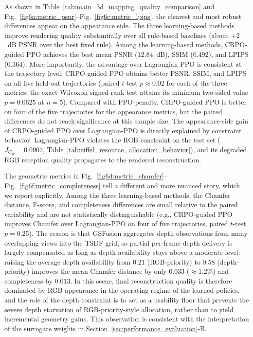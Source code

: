 \documentclass[journal]{IEEEtran}
\begin{document}
As shown in Table~\ref{tab:main_3d_mapping_quality_comparison} and Fig.~\ref{fig6a:metric_psnr}--Fig.~\ref{fig6c:metric_lpips}, the clearest and most robust differences appear on the appearance side. The three learning-based methods improve rendering quality substantially over all rule-based baselines (about $+2$~dB PSNR over the best fixed rule). Among the learning-based methods, CRPO-guided PPO achieves the best mean PSNR ($12.84$~dB), SSIM ($0.492$), and LPIPS ($0.364$). More importantly, the advantage over Lagrangian-PPO is consistent at the trajectory level: CRPO-guided PPO obtains better PSNR, SSIM, and LPIPS on all five held-out trajectories (paired $t$-test $p\approx0.02$ for each of the three metrics; the exact Wilcoxon signed-rank test attains its minimum two-sided value $p=0.0625$ at $n=5$). Compared with PPO-penalty, CRPO-guided PPO is better on four of the five trajectories for the appearance metrics, but the paired differences do not reach significance at this sample size. The appearance-side gain of CRPO-guided PPO over Lagrangian-PPO is directly explained by constraint behavior: Lagrangian-PPO violates the RGB constraint on the test set ($J_{C_R}=0.0907$, Table~\ref{tab:eiffel_resource_allocation_behavior}), and its degraded RGB reception quality propagates to the rendered reconstruction.

The geometric metrics in Fig.~\ref{fig6d:metric_chamfer}--Fig.~\ref{fig6f:metric_completeness} tell a different and more nuanced story, which we report explicitly. Among the three learning-based methods, the Chamfer distance, F-score, and completeness differences are small relative to the paired variability and are not statistically distinguishable (e.g., CRPO-guided PPO improves Chamfer over Lagrangian-PPO on four of five trajectories, paired $t$-test $p=0.25$). The reason is that GSFusion aggregates depth observations from many overlapping views into the TSDF grid, so partial per-frame depth delivery is largely compensated as long as depth availability stays above a moderate level: raising the average depth availability from $0.21$ (RGB-priority) to $0.58$ (depth-priority) improves the mean Chamfer distance by only $0.033$ ($\approx1.2\%$) and completeness by $0.013$. In this scene, final reconstruction quality is therefore dominated by RGB appearance in the operating regime of the learned policies, and the role of the depth constraint is to act as a usability floor that prevents the severe depth starvation of RGB-priority-style allocation, rather than to yield incremental geometry gains. This observation is consistent with the interpretation of the surrogate weights in Section~\ref{sec:performance_evaluation}-B.
\end{document}
